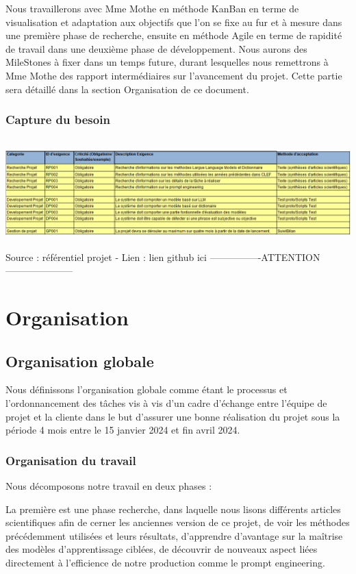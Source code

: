 \documentclass[11pt]{rapport_class}
\begin{document}
Nous travaillerons avec Mme Mothe en méthode KanBan en terme de visualisation et adaptation aux objectifs que l'on se fixe au fur et à mesure dans une première phase de recherche, ensuite en méthode Agile en terme de rapidité de travail dans une deuxième phase de développement.
Nous aurons des MileStones à fixer dans un temps future, durant lesquelles nous remettrons à Mme Mothe des rapport intermédiaires sur l'avancement du projet. Cette partie sera détaillé dans la section Organisation de ce document.

\subsection{Capture du besoin}
\begin{center}
\includegraphics[height=4.2cm]{capture_besoin.png}\\
\tiny
 Source : référentiel projet - Lien : lien github ici ----------------ATTENTION---------------------
\end{center}

\chapter{Organisation}
\section{Organisation globale}
Nous définissons l'organisation globale comme étant le processus et l'ordonnancement des tâches vis à vis d'un cadre d'échange entre l'équipe de projet et la cliente dans le but d'assurer une bonne réalisation du projet sous la période 4 mois entre le 15 janvier 2024 et fin avril 2024.

\subsection{Organisation du travail}
Nous décomposons notre travail en deux phases : 

La première est une phase recherche, dans laquelle nous lisons différents articles scientifiques afin de cerner les anciennes version de ce projet, de voir les méthodes précédemment utilisées et leurs résultats, d'apprendre d'avantage sur la maîtrise des modèles d'apprentissage ciblées, de découvrir de nouveaux aspect liées directement à l'efficience de notre production comme le prompt engineering. 
\end{document}
